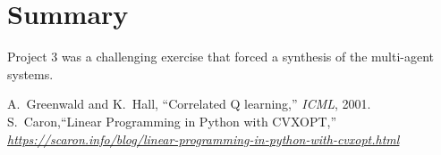 \documentclass[conference]{IEEEtran}
\begin{document}
\section*{Summary}
Project 3 was a challenging exercise that forced a synthesis of the multi-agent systems. 
\begin{thebibliography}{1}
A.~Greenwald and K.~Hall, ``Correlated Q learning,'' {\em ICML}, 2001.
S.~Caron,``Linear Programming in Python with CVXOPT,'' {\em \url {https://scaron.info/blog/linear-programming-in-python-with-cvxopt.html}}
\end{thebibliography}
\end{document}

